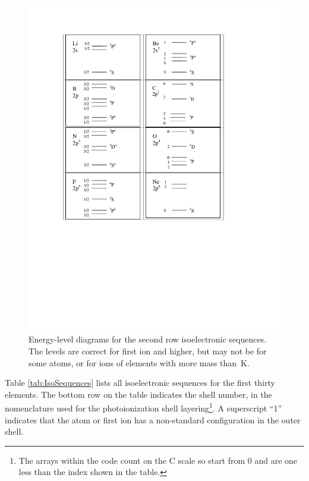 \begin{figure}
\centering
\includegraphics{EnergyLevelsSecondRow}
\caption[Energy level diagrams for second-row elements]{Energy-level diagrams for the second row isoelectronic
sequences. The levels are correct for first ion and higher, but may not
be for some atoms, or for ions of elements with more mass than~K.}
\label{fig:EnergyLevelsSecondRow}
\end{figure}

Table \ref{tab:IsoSequences} lists all isoelectronic sequences for the first thirty elements.
The bottom row on the table indicates the shell number, in the nomenclature
used for the photoionization shell layering\footnote{The arrays within the code count on the C scale so start from 0 and are one less than the index shown in the table.}.
A superscript ``1'' indicates that the atom or first ion has a non-standard configuration in the outer shell.

